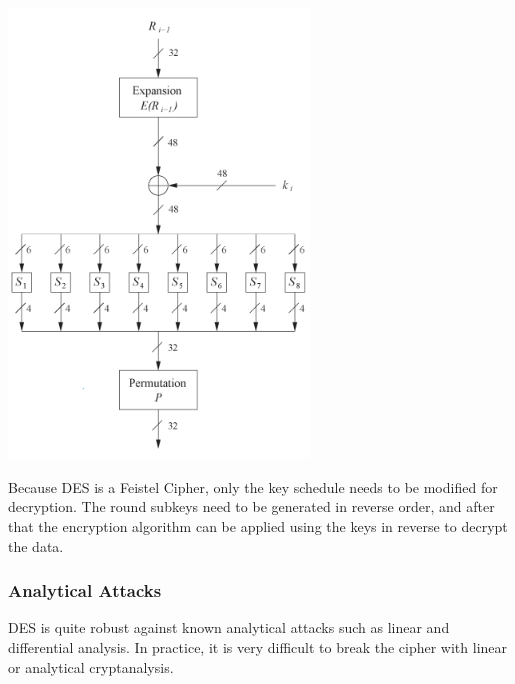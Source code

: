 \documentclass{math}
\begin{document}
\begin{center}
  \includegraphics[width=8cm]{assets/des_round.png}
\end{center}
Because DES is a Feistel Cipher, only the key schedule needs to be modified for
decryption. The round subkeys need to be generated in reverse order, and after
that the encryption algorithm can be applied using the keys in reverse to
decrypt the data.

\subsubsection*{Analytical Attacks}
DES is quite robust against known analytical attacks such as linear and
differential analysis. In practice, it is very difficult to break the cipher
with linear or analytical cryptanalysis.
\end{document}
